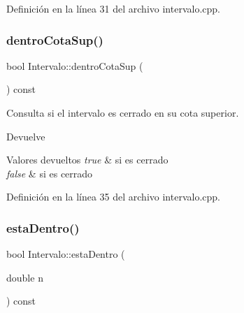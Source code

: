 Definición en la línea 31 del archivo intervalo.\+cpp.


\begin{DoxyCode}{0}

\end{DoxyCode}
\mbox{\label{classIntervalo_aed0964a68d4b727bd104f5128ee7a7ef}} 
\subsubsection{\texorpdfstring{dentroCotaSup()}{dentroCotaSup()}}
{\footnotesize\ttfamily bool Intervalo\+::dentro\+Cota\+Sup (\begin{DoxyParamCaption}{ }\end{DoxyParamCaption}) const}



Consulta si el intervalo es cerrado en su cota superior. 

\begin{DoxyReturn}{Devuelve}

\end{DoxyReturn}

\begin{DoxyRetVals}{Valores devueltos}
{\em true} & si es cerrado\\
\hline
{\em false} & si es cerrado \\
\hline
\end{DoxyRetVals}


Definición en la línea 35 del archivo intervalo.\+cpp.


\begin{DoxyCode}{0}

\end{DoxyCode}
\mbox{\label{classIntervalo_a2cccd9264f1b3912c6006fe3e2a70289}} 
\subsubsection{\texorpdfstring{estaDentro()}{estaDentro()}}
{\footnotesize\ttfamily bool Intervalo\+::esta\+Dentro (\begin{DoxyParamCaption}\item[{double}]{n }\end{DoxyParamCaption}) const}



